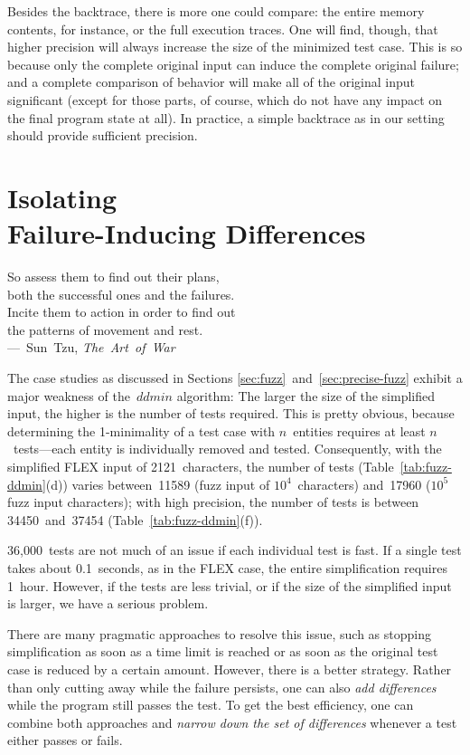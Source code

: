 \documentclass{acm_proc_article-sp}
\newcommand{\FLEX}       {{\small FLEX}\xspace}
\newcommand{\ddmin}{\textit{ddmin}\xspace}
\newenvironment{Quote}{%
\smallskip
\begin{minipage}[t]{\columnwidth}
\begin{flushright}%
\itshape%
\samepage%
}{\end{flushright}\end{minipage}\par}
\newcommand{\By}[2]{\\[1mm]---~\mbox{\textnormal{#1}} \mbox{\textsl{#2}}}
\theoremstyle{plain}
\begin{document}
Besides the backtrace, there is more one could compare: the entire
memory contents, for instance, or the full execution traces.  One will
find, though, that higher precision will always increase the size of
the minimized test case.  This is so because only the complete
original input can induce the complete original failure; and a
complete comparison of behavior will make all of the original input
significant (except for those parts, of course, which do not have any
impact on the final program state at all).  In practice, a simple
backtrace as in our setting should provide sufficient precision.


\section{Isolating \\
  Failure-Inducing Differences}
\label{sec:isolating-differences}

\begin{Quote}
  So assess them to find out their plans, \\
  both the successful ones and the failures. \\
  Incite them to action in order to find out \\
  the patterns of movement and rest.
\By{Sun Tzu,}{The Art of War}
\end{Quote}

The case studies as discussed in Sections
\ref{sec:fuzz}~and~\ref{sec:precise-fuzz} exhibit a major weakness of
the~$\ddmin$ algorithm: The larger the size of the simplified input,
the higher is the number of tests required.  This is pretty obvious,
because determining the 1-minimality of a test case with $n$~entities
requires at least $n$~tests---each entity is individually removed and
tested.  Consequently, with the simplified \FLEX input of
2121~characters, the number of tests (Table~\ref{tab:fuzz-ddmin}(d))
varies between~11589 (fuzz input of $10^4$~characters) and~17960
($10^5$ fuzz input characters); with high precision, the number of
tests is between 34450~and~37454 (Table~\ref{tab:fuzz-ddmin}(f)).

36,000~tests are not much of an issue if each individual test is fast.
If a single test takes about 0.1~seconds, as in the \FLEX case, the
entire simplification requires 1~hour.  However, if the tests are less
trivial, or if the size of the simplified input is larger, we have a
serious problem.

There are many pragmatic approaches to resolve this issue, such as
stopping simplification as soon as a time limit is reached or as soon
as the original test case is reduced by a certain amount.  However,
there is a better strategy.  Rather than only cutting away while the
failure persists, one can also \emph{add differences} while the
program still passes the test.  To get the best efficiency, one can
combine both approaches and \emph{narrow down the set of differences}
whenever a test either passes or fails.
\end{document}
